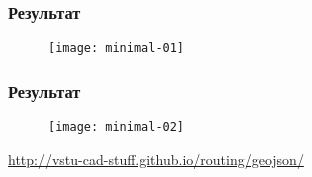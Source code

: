 





\begin{frame}
    \frametitle{Результат}
    \begin{figure}[ht!]
        \centering
        \texttt{[image: minimal-01]}
    \end{figure}
\end{frame}

\begin{frame}
    \frametitle{Результат}
    \begin{figure}[ht!]
        \centering
        \texttt{[image: minimal-02]}
    \end{figure}
    \url{http://vstu-cad-stuff.github.io/routing/geojson/}
\end{frame}

